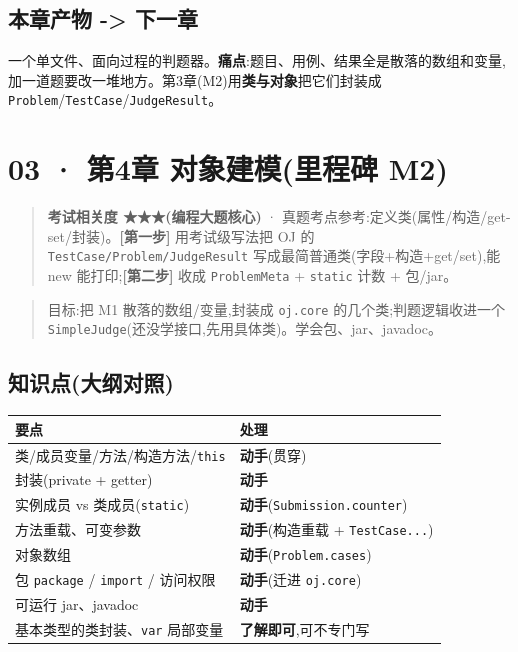 \documentclass[
  11pt,
]{ctexart}
\begin{document}
\hypertarget{ux672cux7ae0ux4ea7ux7269---ux4e0bux4e00ux7ae0}{%
\subsection{本章产物 -\textgreater{}
下一章}\label{ux672cux7ae0ux4ea7ux7269---ux4e0bux4e00ux7ae0}}

一个单文件、面向过程的判题器。\textbf{痛点}:题目、用例、结果全是散落的数组和变量,加一道题要改一堆地方。第3章(M2)用\textbf{类与对象}把它们封装成
\texttt{Problem}/\texttt{TestCase}/\texttt{JudgeResult}。

\hypertarget{ux7b2c4ux7ae0-ux5bf9ux8c61ux5efaux6a21ux91ccux7a0bux7891-m2}{%
\section{03 · 第4章 对象建模(里程碑
M2)}\label{ux7b2c4ux7ae0-ux5bf9ux8c61ux5efaux6a21ux91ccux7a0bux7891-m2}}

\begin{quote}
\textbf{考试相关度 ★★★(编程大题核心)} ·
真题考点参考:定义类(属性/构造/get-set/封装)。\textbf{{[}第一步{]}}
\KS 用考试级写法把 OJ 的 \texttt{TestCase/Problem/JudgeResult}
写成最简普通类(字段+构造+get/set),能 new 能打印;\textbf{{[}第二步{]}}
\GC 收成 \texttt{ProblemMeta} + \texttt{static} 计数 + 包/jar。
\end{quote}

\begin{quote}
目标:把 M1 散落的数组/变量,封装成 \texttt{oj.core}
的几个类;判题逻辑收进一个
\texttt{SimpleJudge}(还没学接口,先用具体类)。学会包、jar、javadoc。
\end{quote}

\hypertarget{ux77e5ux8bc6ux70b9ux5927ux7eb2ux5bf9ux7167-2}{%
\subsection{知识点(大纲对照)}\label{ux77e5ux8bc6ux70b9ux5927ux7eb2ux5bf9ux7167-2}}

\begin{longtable}[]{@{}ll@{}}
\toprule\noalign{}
要点 & 处理 \\
\midrule\noalign{}
\endhead
\bottomrule\noalign{}
\endlastfoot
类/成员变量/方法/构造方法/\texttt{this} & \textbf{动手}(贯穿) \\
封装(private + getter) & \textbf{动手} \\
实例成员 vs 类成员(\texttt{static}) &
\textbf{动手}(\texttt{Submission.counter}) \\
方法重载、可变参数 & \textbf{动手}(构造重载 + \texttt{TestCase...}) \\
对象数组 & \textbf{动手}(\texttt{Problem.cases}) \\
包 \texttt{package} / \texttt{import} / 访问权限 & \textbf{动手}(迁进
\texttt{oj.core}) \\
可运行 jar、javadoc & \textbf{动手} \\
基本类型的类封装、\texttt{var} 局部变量 &
\textbf{了解即可},可不专门写 \\
\end{longtable}
\end{document}
